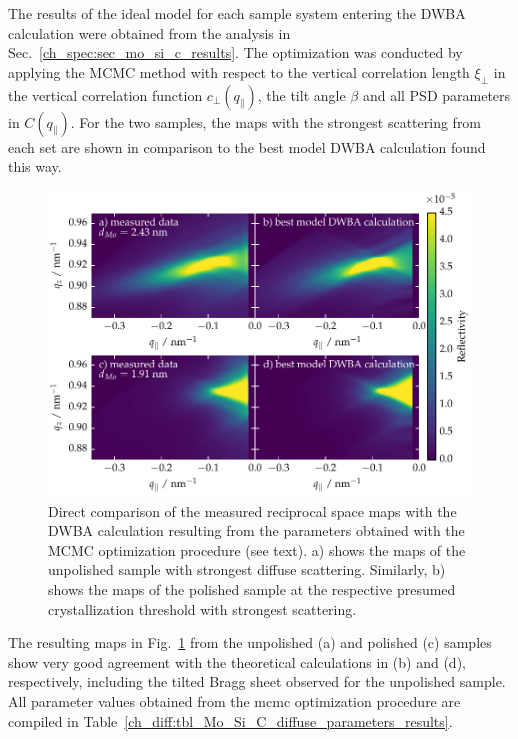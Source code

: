 The results of the ideal model for each sample system entering the DWBA calculation were obtained from the analysis in Sec.~\ref{ch_spec:sec_mo_si_c_results}. The optimization was conducted by applying the MCMC method with respect to the vertical correlation length $\xi_\perp$ in the vertical correlation function $c_\perp(q_\parallel)$, the tilt angle $\beta$ and all PSD parameters in $C(q_\parallel)$. For the two samples, the maps with the strongest scattering from each set are shown in comparison to the best model DWBA calculation found this way. 
\begin{figure}[htbp]
\centering
\includegraphics[width=\textwidth]{img/MoSiC_dwba_data_best_model_comparison}
\caption{Direct comparison of the measured reciprocal space maps with the DWBA calculation resulting from the parameters obtained with the MCMC optimization procedure (see text). a) shows the maps of the unpolished sample with strongest diffuse scattering. Similarly, b) shows the maps of the polished sample at the respective presumed crystallization threshold with strongest scattering.}
\label{fig:dwba_data_best_model_comparison}
\end{figure}
The resulting maps in Fig.~\ref{fig:dwba_data_best_model_comparison} from the unpolished (a) and polished (c) samples show very good agreement with the theoretical calculations in (b) and (d), respectively, including the tilted Bragg sheet observed for the unpolished sample. All parameter values obtained from the \gls{mcmc} optimization procedure are compiled in Table~\ref{ch_diff:tbl_Mo_Si_C_diffuse_parameters_results}. 
